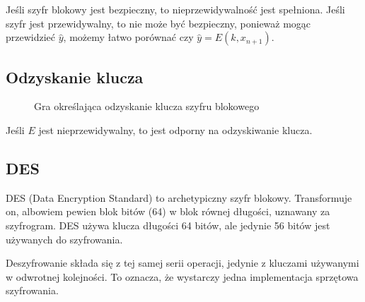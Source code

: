 \documentclass{../notatki}
\begin{document}
Jeśli szyfr blokowy jest bezpieczny, to nieprzewidywalność jest spełniona.
Jeśli szyfr jest przewidywalny, to nie może być bezpieczny, ponieważ mogąc
przewidzieć $\hat{y}$, możemy łatwo porównać czy $\hat{y} = E(k, x_{n+1})$.

\subsection{Odzyskanie klucza}

\begin{figure}[H]
  \centering
  \caption{Gra określająca odzyskanie klucza szyfru blokowego}
\end{figure}

Jeśli $E$ jest nieprzewidywalny, to jest odporny na odzyskiwanie klucza.

\subsection{DES}

DES (Data Encryption Standard) to archetypiczny szyfr blokowy. Transformuje on,
albowiem pewien blok bitów (64) w blok równej długości, uznawany za szyfrogram.
DES używa klucza długości 64 bitów, ale jedynie 56 bitów jest używanych do
szyfrowania.

Deszyfrowanie składa się z tej samej serii operacji, jedynie z kluczami
używanymi w odwrotnej kolejności. To oznacza, że wystarczy jedna implementacja
sprzętowa szyfrowania.
\end{document}
